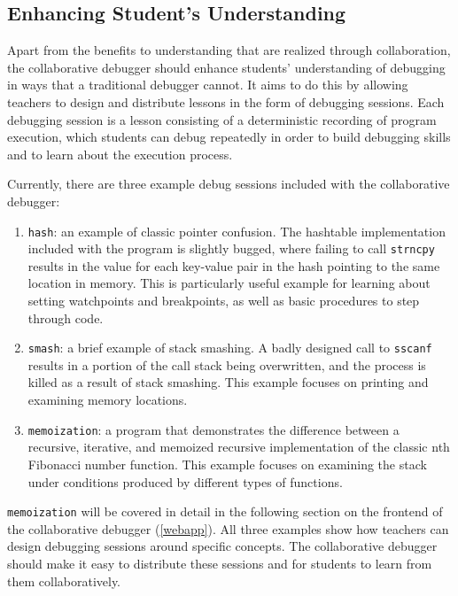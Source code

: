\documentclass[12pt]{article}
\begin{document}
\subsection{Enhancing Student's Understanding}

Apart from the benefits to understanding that are realized through
collaboration, the collaborative debugger should enhance students'
understanding of debugging in ways that a traditional debugger cannot.
It aims to do this by allowing teachers to design and distribute
lessons in the form of debugging sessions.  Each debugging session is
a lesson consisting of a deterministic recording of program execution,
which students can debug repeatedly in order to build debugging skills
and to learn about the execution process.
\par

Currently, there are three example debug sessions included with the
collaborative debugger:

\begin{enumerate}
\item \lstinline{hash}: an example of classic pointer confusion.  The
  hashtable implementation included with the program is slightly
  bugged, where failing to call \lstinline{strncpy} results in the
  value for each key-value pair in the hash pointing to the same
  location in memory.  This is particularly useful example for learning
  about setting watchpoints and breakpoints, as well as basic
  procedures to step through code.
\item \lstinline{smash}: a brief example of stack smashing.  A badly
  designed call to \lstinline{sscanf} results in a portion of the call
  stack being overwritten, and the process is killed as a result of
  stack smashing.  This example focuses on printing and examining
  memory locations.
\item \lstinline{memoization}: a program that demonstrates the
  difference between a recursive, iterative, and memoized recursive
  implementation of the classic nth Fibonacci number function.  This
  example focuses on examining the stack under conditions produced by
  different types of functions.
\end{enumerate}

\lstinline{memoization} will be covered in detail in the following
section on the frontend of the collaborative debugger (\ref{webapp}).
All three examples show how teachers can design debugging sessions
around specific concepts.  The collaborative debugger should make it
easy to distribute these sessions and for students to learn from them
collaboratively.
\par
\end{document}
